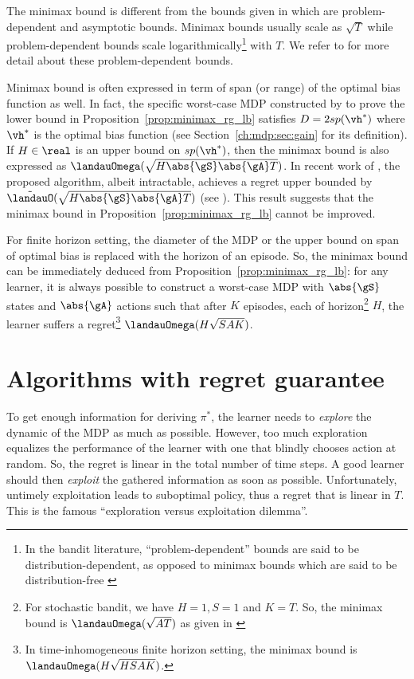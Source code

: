 The minimax bound is different from the bounds given in \cite{ok2018exploration, burnetas1997optimal} which are problem-dependent and asymptotic bounds.
Minimax bounds usually scale as $\sqrt{T}$ while problem-dependent bounds scale logarithmically\footnote{In the bandit literature, “problem-dependent” bounds are said to be distribution-dependent, as opposed to minimax bounds which are said to be distribution-free \cite{garivier2019explore}} with $T$.
We refer to \cite{ok2018exploration, burnetas1997optimal} for more detail about these problem-dependent bounds.

Minimax bound is often expressed in term of span (or range) of the optimal bias function as well.
In fact, the specific worst-case MDP constructed by \cite{jaksch2010near} to prove the lower bound in Proposition~\ref{prop:minimax_rg_lb} satisfies $D=2sp(\vh^*)$ where $\vh^*$ is the optimal bias function (see Section~\ref{ch:mdp:sec:gain} for its definition).
If $H\in\real$ is an upper bound on $sp(\vh^*)$, then the minimax bound is also expressed as $\landauOmega(\sqrt{H\abs{\gS}\abs{\gA}T})$.
In recent work of \cite{zhang2019regret}, the proposed algorithm, albeit intractable,  achieves a regret upper bounded by $\tilde{\landauO}(\sqrt{H\abs{\gS}\abs{\gA}T})$ (see \cite[Theorem~1]{zhang2019regret}).
This result suggests that the minimax bound in Proposition~\ref{prop:minimax_rg_lb} cannot be improved.

For finite horizon setting, the diameter of the MDP or the upper bound on span of optimal bias is replaced with the horizon of an episode.
So, the minimax bound can be immediately deduced from Proposition~\ref{prop:minimax_rg_lb}: for any learner, it is always possible to construct a worst-case MDP with $\abs{\gS}$ states and $\abs{\gA}$ actions such that after $K$ episodes, each of horizon\footnote{For stochastic bandit, we have $H=1, S=1$ and $K=T$. So, the minimax bound is $\landauOmega(\sqrt{AT})$ as given in \cite{bubeck2012regret}} $H$, the learner suffers a regret\footnote{In time-inhomogeneous finite horizon setting, the minimax bound is $\landauOmega(H\sqrt{HSAK})$.} $\landauOmega(H\sqrt{SAK})$.


\section{Algorithms with regret guarantee}

To get enough information for deriving $\pi^*$, the learner needs to \emph{explore} the dynamic of the MDP as much as possible.
However, too much exploration equalizes the performance of the learner with one that blindly chooses action at random.
So, the regret is linear in the total number of time steps.
A good learner should then \emph{exploit} the gathered information as soon as possible.
Unfortunately, untimely exploitation leads to suboptimal policy, thus a regret that is linear in $T$. This is the famous “exploration versus exploitation dilemma”.

